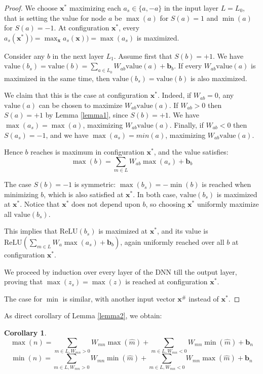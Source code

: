 \documentclass[]{article}
\newtheorem{corollary}{Corollary}
\theoremstyle{definition}
\newcommand{\ReLU}{\mathrm{ReLU}}
\newcommand{\Val}{\mathrm{value}}
\begin{document}
	\begin{proof}
		We choose $\boldsymbol{x}^*$ maximizing each $a_s \in \{a,-a\}$ in the input layer $L=L_0$,
		that is setting the value for node $a$ be $\max(a)$ for $S(a)=1$ and $\min(a)$ for $S(a)=-1$.
		At configuration $\boldsymbol{x}^*$, every $a_s(\boldsymbol{x}^*))=\max_{\boldsymbol{x}} {a_s(\boldsymbol{x}))}=\max(a_s)$ is maximized.  
		
		Consider any $b$ in the next layer $L_1$.
		Assume first that $S(b)=+1$.
		We have $\Val(b_s)= \Val(b) = \sum_{a \in L_0} W_{ab} \Val(a) + \boldsymbol{b}_b$.
		If every $W_{ab} \Val(a)$ is maximized in the same time, 
		then $\Val(b_s)= \Val(b)$ is also maximized. 
		
		We claim that this is the case at 
		configuration $\boldsymbol{x}^*$.
		Indeed, if $W_{ab}=0$, any $\Val(a)$ can be chosen to maximize 
		$W_{ab}\Val(a)$. If $W_{ab}>0$ then $S(a) = +1$ by Lemma \ref{lemma1}, since
		$S(b)=+1$. We have $\max(a_s) = \max(a)$, maximizing $W_{ab}\Val(a)$.
		Finally, if $W_{a b}<0$ then $S(a_s) = -1$, and we have 
		$\max(a_s) = min(a)$, maximizing $W_{ab}\Val(a)$.
		
		Hence $b$ reaches is maximum in configuration $\boldsymbol{x}^*$, and the value satisfies: 
		$$\max(b)=\sum_{m \in L}W_{a b} \max(a_s)+\boldsymbol{b}_b$$
		
		The case $S(b)=-1$ is symmetric:
		$\max(b_s)= -\min(b)$ is reached when minimizing $b$, which is also 
		satisfied at $\boldsymbol{x}^*$.
		In both case, $\Val(b_s)$ is maximized at $\boldsymbol{x}^*$. Notice that $\boldsymbol{x}^*$ does not depend upon $b$, so choosing $\boldsymbol{x}^*$ uniformly maximize all $\Val(b_s)$.
		
		This implies that $\ReLU(b_s)$ is maximized at $\boldsymbol{x}^*$, and its value is 
		$\ReLU(\sum_{m \in L}W_{a }\max(a_s)+\boldsymbol{b}_b)$, again uniformly reached over all $b$ at configuration $\boldsymbol{x}^*$.
		
		We proceed by induction over every layer of the DNN till the output layer, proving that 
		$\max(z_s)=\max(z)$ is reached at configuration $\boldsymbol{x}^*$.
		
		The case for $\min$ is similar, with another input vector $\boldsymbol{x}^\#$ instead of $\boldsymbol{x}^*$.
	\end{proof}
	
	As direct corollary of Lemma \ref{lemma2}, we obtain:
	
	\begin{corollary}
		\label{cor1}
		$$\max(n)=\sum_{m \in L, W_{m n}>0}W_{m n} \max(\hat{m}) + \sum_{m \in L, W_{m n}<0}W_{mn} \min(\hat{m}) + \boldsymbol{b}_n$$
		$$\min(n)=\sum_{m \in L, W_{m n}>0}W_{m n} \min(\hat{m}) + \sum_{m \in L, W_{m n}<0}W_{mn} \max(\hat{m}) + \boldsymbol{b}_n$$
	\end{corollary}
	
\end{document}

